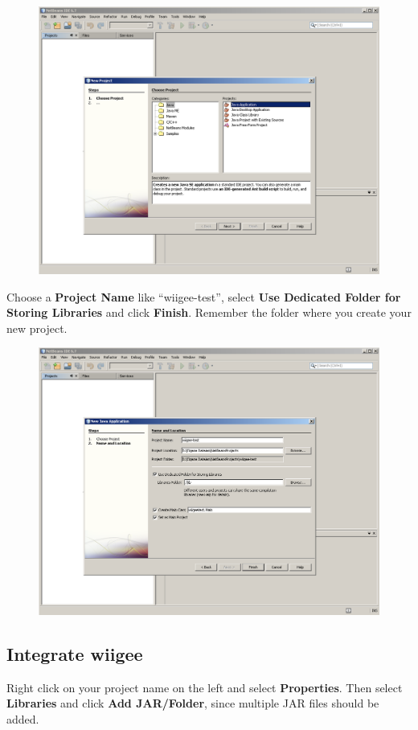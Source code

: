 \documentclass[%
   11pt,              %
   english,           %
   a4paper,           %
   DIV11,             %
   BCOR12mm,		  %
   titlepage,		  %
   bibtotoc,		  %
   liststotoc,		  %
   final,			  %
   twoside,			  %
   openright,		  %
   cleardoubleempty   %
]{scrreprt}%
\begin{document}
\begin{figure}[h]
\centering
\includegraphics[width=0.95\linewidth]{img/setup/netbeans/step1.png}
\end{figure}

Choose a \textbf{Project Name} like "`wiigee-test"', select \textbf{Use Dedicated Folder for Storing Libraries} and click \textbf{Finish}. Remember the folder where you create your new project.

\begin{figure}[h]
\centering
\includegraphics[width=0.95\linewidth]{img/setup/netbeans/step2.png}
\end{figure}

\subsection{Integrate wiigee}
Right click on your project name on the left and select \textbf{Properties}. Then select \textbf{Libraries} and click \textbf{Add JAR/Folder}, since multiple JAR files should be added.
\end{document}
